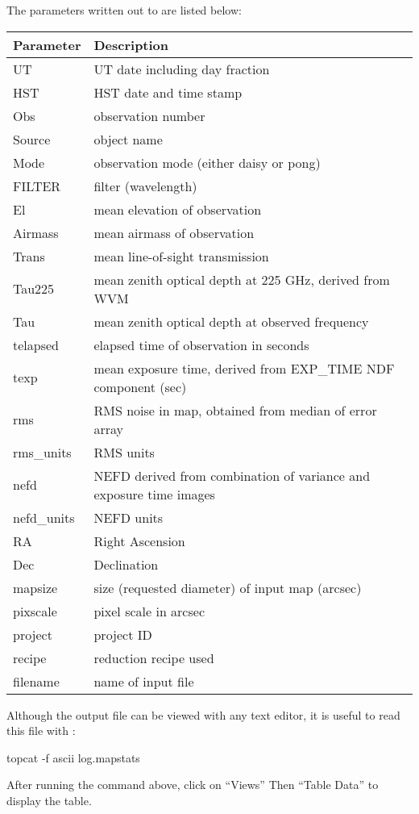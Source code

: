 The parameters written out to  are listed below:
\begin{table}[h!]
  \begin{center}
    \begin{tabular}{|p{2.5cm}|p{12cm}|}
      \hline
      \textbf{Parameter} & \textbf{Description}\\
      \hline
      UT & UT date including day fraction\\
      HST & HST date and time stamp \\
      Obs & observation number\\
      Source & object name\\
      Mode & observation mode (either daisy or pong)\\
      FILTER & filter (wavelength)\\
      El & mean elevation of observation\\
      Airmass & mean airmass of observation\\
      Trans & mean line-of-sight transmission\\
      Tau225 & mean zenith optical depth at 225 GHz, derived from WVM\\
      Tau & mean zenith optical depth at observed frequency\\
      telapsed & elapsed time of observation in seconds\\
      texp & mean exposure time, derived from EXP\_TIME NDF component (sec)\\
      rms & RMS noise in map, obtained from median of error array\\
      rms\_units & RMS units\\
      nefd & NEFD derived from combination of variance and exposure time images\\
      nefd\_units & NEFD units\\
      RA & Right Ascension\\
      Dec & Declination\\
      mapsize & size (requested diameter) of input map (arcsec)\\
      pixscale & pixel scale in arcsec\\
      project & project ID\\
      recipe & reduction recipe used\\
      filename & name of input file\\
      \hline
    \end{tabular}
  \end{center}
\end{table}

Although the output file  can be viewed with any text editor, it is useful to read this file with \topcat:

\begin{terminalv}
topcat -f ascii log.mapstats
\end{terminalv}

After running the command above, click on ``Views'' Then ``Table Data'' to display the table.

